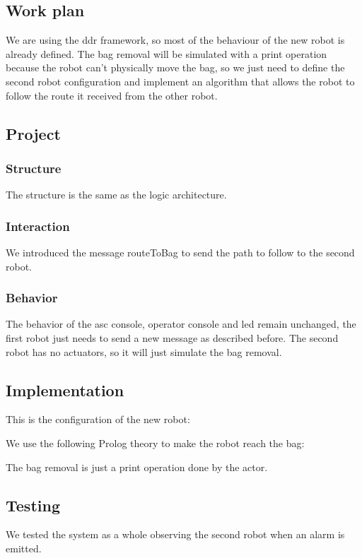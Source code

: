 \documentclass{llncs}
\begin{document}
\subsection{Work plan}
We are using the ddr framework, so most of the behaviour of the new robot is already defined. The bag removal will be simulated with a print operation because the robot can't physically move the bag, so we just need to define the second robot configuration and implement an algorithm that allows the robot to follow the route it received from the other robot. 
\subsection{Project}
\subsubsection{Structure}
The structure is the same as the logic architecture.
\subsubsection{Interaction}
We introduced the message routeToBag to send the path to follow to the second robot. 
\subsubsection{Behavior}
The behavior of the asc console, operator console and led remain unchanged, the first robot just needs to send a new message as described before. The second robot has no actuators, so it will just simulate the bag removal.

\subsection{Implementation}
This is the configuration of the new robot:

We use the following Prolog theory to make the robot reach the bag:

The bag removal is just a print operation done by the actor.
\subsection{Testing}
We tested the system as a whole observing the second robot when an alarm is emitted.
\end{document}
